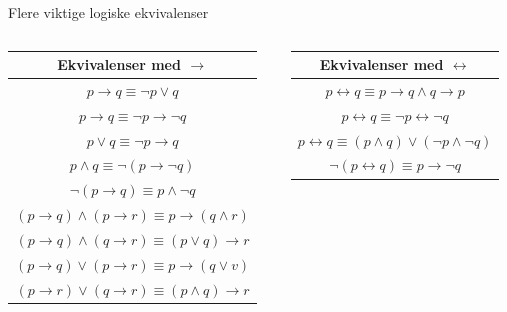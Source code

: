 \begin{frame}{Flere viktige logiske ekvivalenser}
    \begin{columns}
    \begin{column}{0.48\textwidth}
        \begin{tabular}{c}
            Ekvivalenser med $\rightarrow$ \\ \hline
            $p \rightarrow q \equiv \lnot p \lor q$ \\
            $p \rightarrow q \equiv \lnot p \rightarrow \lnot q$ \\
            $p \lor q \equiv \lnot p \rightarrow q$ \\
            $p \land q \equiv \lnot (p \rightarrow \lnot q)$ \\
            $\lnot (p \rightarrow q) \equiv p \land \lnot q$ \\
            $(p \rightarrow q) \land (p \rightarrow r) \equiv p \rightarrow (q \land r)$ \\
            $(p \rightarrow q) \land (q \rightarrow r) \equiv (p \lor q) \rightarrow r$ \\
            $(p \rightarrow q) \lor (p \rightarrow r) \equiv p \rightarrow (q \lor v)$ \\
            $(p \rightarrow r) \lor (q \rightarrow r) \equiv (p \land q) \rightarrow r$
        \end{tabular}
    \end{column}
    \begin{column}{0.48\textwidth}
        \begin{tabular}{c}
            Ekvivalenser med $\leftrightarrow$ \\ \hline
            $p \leftrightarrow q \equiv p \rightarrow q \land q \rightarrow p$ \\
            $p \leftrightarrow q \equiv \lnot p \leftrightarrow \lnot q$ \\
            $p \leftrightarrow q \equiv (p \land q) \lor (\lnot p \land \lnot q)$\\
            $\lnot (p \leftrightarrow q) \equiv p \rightarrow \lnot q$
        \end{tabular}
    \end{column}
    \end{columns}
\end{frame}


